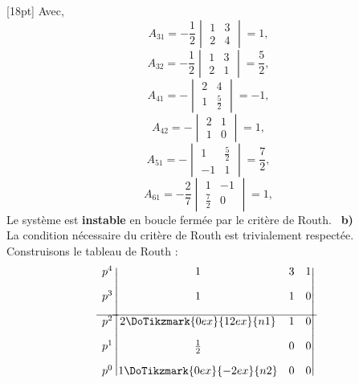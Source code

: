 [18pt]
Avec, 
\[
A_{31}=-\dfrac{1}{2}\begin{vmatrix}1 & 3 \\2&4\end{vmatrix}=1,
\]
\[
A_{32}=-\dfrac{1}{2}\begin{vmatrix}1 & 3 \\2&1\end{vmatrix}=\dfrac{5}{2},
\]
\[
A_{41}=-\begin{vmatrix}2 & 4 \\1&\frac{5}{2}\end{vmatrix}=-1,
\]
\[
A_{42}=-\begin{vmatrix}2 & 1 \\1&0\end{vmatrix}=1,
\]
\[
A_{51}=-\begin{vmatrix}1&\frac{5}{2}\\-1&1\end{vmatrix}=\dfrac{7}{2},
\]
\[
A_{61}=-\dfrac{2}{7}\begin{vmatrix}1 & -1 \\\frac{7}{2}&0\end{vmatrix}=1,
\]
Le système est \textbf{instable} en boucle fermée par le critère de Routh.
\noindent~\textbf{b)}\\
La condition nécessaire du critère de Routh est trivialement respectée.
Construisons le tableau de Routh :
\[
\begin{matrix}
    p^4 \\[1em]
    p^3 \\[1em]
    \hline
    p^2 \\[1em]
    p^1 \\[1em]
    p^0 
\end{matrix}
\begin{vmatrix}
    1      & 3   & 1 \\[1em]
    1      & 1   & 0 \\[1em]
    \hline
    2\DoTikzmark{0ex}{12ex}{n1}   & 1 & 0 \\[1em]
    \frac{1}{2}    & 0  & 0 \\[1em]
    1\DoTikzmark{0ex}{-2ex}{n2}  & 0  &  0 
\end{vmatrix}
\]
